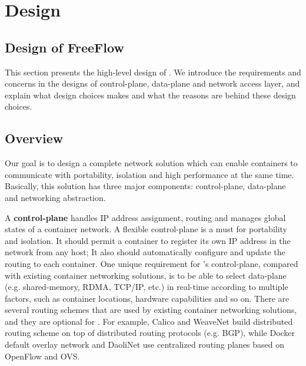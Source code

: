 \section{Design} \label{sec:design}

\subsection{Design of FreeFlow}

This section presents the high-level design of \sysname. We introduce
the requirements and concerns in the designs of control-plane, data-plane
and network access layer, and explain what design choices \sysname makes 
and what the reasons are behind these design choices.

\subsection{Overview}

Our goal is to design a complete network solution which can enable containers
to communicate with portability, isolation and high performance at the same time.
Basically, this solution has three major components: control-plane, data-plane 
and networking abstraction. 



A \textbf{control-plane} handles IP address assignment, routing and manages global states of a container network.
A flexible control-plane is a must for portability and isolation. 
It should permit a container to register its own IP address in the network
from any host; It also should automatically configure and update the routing 
to each container. One unique requirement for \sysname's control-plane,
compared with existing container networking solutions, is to be able to 
select data-plane (e.g. shared-memory, RDMA, TCP/IP, etc.) in real-time
according to multiple factors, such as container locations, hardware 
capabilities and so on. 
There are several routing schemes that are used by existing
container networking solutions, and they are optional for \sysname. 
For example, Calico and WeaveNet build distributed routing scheme on top of 
distributed routing protocols (e.g. BGP), while Docker default overlay network
and DaoliNet use centralized routing planes based on OpenFlow and OVS.


